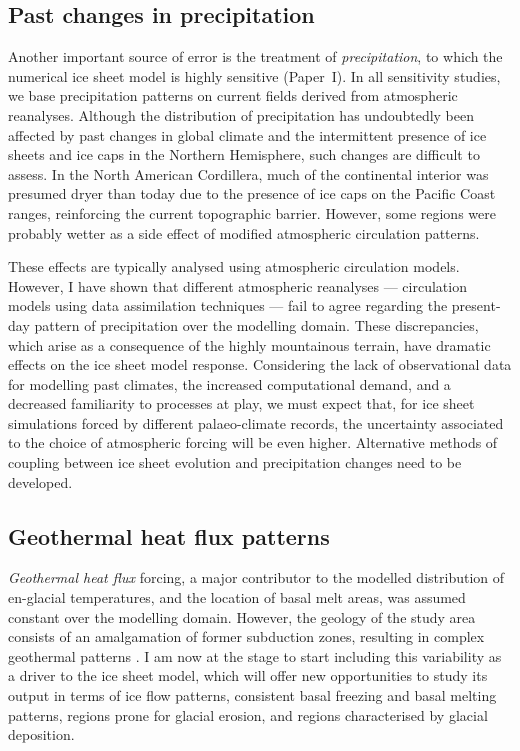 \documentclass[a4paper]{kappa}
\newcommand{\CCLI}[0]{Paper~I}      %
\begin{document}
\subsection{Past changes in precipitation}

Another important source of error is the treatment of \emph{precipitation}, to
which
the numerical ice sheet model is highly sensitive (\CCLI). In all sensitivity
studies, we base precipitation patterns on current fields derived from
atmospheric
reanalyses. Although the distribution of precipitation has undoubtedly
been affected by past changes in global climate and the intermittent presence
of ice sheets and ice caps in the Northern Hemisphere, such changes are
difficult to assess. In the North American Cordillera, much of the continental
interior was presumed dryer than today due to the presence of ice caps on the
Pacific Coast ranges, reinforcing the current topographic barrier. However,
some regions were probably wetter as a side effect of modified atmospheric
circulation patterns.

These effects are typically analysed using atmospheric
circulation models. However, I have shown that different atmospheric reanalyses
--- circulation models using data assimilation techniques --- fail to agree
regarding the present-day pattern of precipitation over the modelling domain.
These discrepancies, which arise as a consequence of the highly mountainous
terrain, have dramatic effects on the ice sheet model response. Considering the
lack of observational data for modelling past climates, the increased
computational demand, and a decreased familiarity to processes at play, we must
expect that, for ice sheet simulations forced by different palaeo-climate
records, the uncertainty associated to the choice of atmospheric forcing
will be even higher. Alternative methods of coupling between ice sheet
evolution and precipitation changes need to be developed.


\subsection{Geothermal heat flux patterns}

\emph{Geothermal heat flux} forcing, a major contributor to the modelled
distribution
of en-glacial temperatures, and the location of basal melt areas, was assumed
constant over the modelling domain. However, the geology of the study area
consists of an amalgamation of former subduction zones, resulting in complex
geothermal patterns \citep{Blackwell.Richards.2004}. I am now at the stage to
start including this variability as a driver to the ice sheet model, which will
offer new opportunities to study its output in terms of ice flow patterns,
consistent basal freezing and basal melting patterns, regions prone for glacial
erosion, and regions characterised by glacial deposition.
\end{document}
